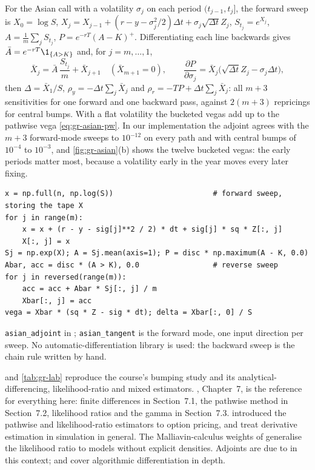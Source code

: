For the Asian call with a volatility $\sigma_j$ on each period $(t_{j-1},t_j]$, the forward sweep
is $X_0=\log S$, $X_j=X_{j-1}+(r-y-\sigma_j^2/2)\Delta t+\sigma_j\sqrt{\Delta t}Z_j$,
$S_{t_j}=e^{X_j}$, $A=\frac1m\sum_jS_{t_j}$, $P=e^{-rT}(A-K)^+$. Differentiating each line
backwards gives $\bar A=e^{-rT}\1_{\{A>K\}}$ and, for $j=m,\dots,1$,
\[
  \bar X_j=\bar A\,\frac{S_{t_j}}m+\bar X_{j+1}\quad(\bar X_{m+1}=0),\qquad
  \frac{\partial P}{\partial\sigma_j}=\bar X_j\big(\sqrt{\Delta t}Z_j-\sigma_j\Delta t\big),
\]
then $\Delta=\bar X_1/S$, $\rho_y=-\Delta t\sum_j\bar X_j$ and
$\rho_r=-TP+\Delta t\sum_j\bar X_j$: all $m+3$ sensitivities for one forward and one backward
pass, against $2(m+3)$ repricings for central bumps. With a flat volatility the bucketed vegas
add up to the pathwise vega \eqref{eq:gr-asian-pw}. In our implementation the adjoint agrees
with the $m+3$ forward-mode sweeps to $10^{-12}$ on every path and with central bumps of
$10^{-4}$ to $10^{-3}$, and \cref{fig:gr-asian}(b) shows the twelve bucketed vegas: the early periods
matter most, because a volatility early in the year moves every later fixing.

\begin{incode}
\begin{lstlisting}
x = np.full(n, np.log(S))                       # forward sweep, storing the tape X
for j in range(m):
    x = x + (r - y - sig[j]**2 / 2) * dt + sig[j] * sq * Z[:, j]
    X[:, j] = x
Sj = np.exp(X); A = Sj.mean(axis=1); P = disc * np.maximum(A - K, 0.0)
Abar, acc = disc * (A > K), 0.0                 # reverse sweep
for j in reversed(range(m)):
    acc = acc + Abar * Sj[:, j] / m
    Xbar[:, j] = acc
vega = Xbar * (sq * Z - sig * dt); delta = Xbar[:, 0] / S
\end{lstlisting}
\texttt{asian\_adjoint} in ; \texttt{asian\_tangent} is the
forward mode, one input direction per sweep. No automatic-differentiation library is used:
the backward sweep is the chain rule written by hand.
\end{incode}


\furtherreading
{} and \cref{tab:gr-lab} reproduce the course's bumping study and its
analytical-differencing, likelihood-ratio and mixed estimators. \textcite{glasserman-mc},
Chapter~7, is the reference for everything here: finite differences in Section~7.1, the
pathwise method in Section~7.2, likelihood ratios and the gamma in Section~7.3.
\textcite{broadie-glasserman-greeks} introduced the pathwise and likelihood-ratio estimators
to option pricing, and \citet[Chapter~VII]{asmussen-glynn} treat derivative estimation in
simulation in general. The Malliavin-calculus weights of \textcite{fournie-malliavin} generalise
the likelihood ratio to models without explicit densities. Adjoints are due to
\textcite{giles-glasserman-adjoints} in this context; \textcite{capriotti-aad} and
\textcite{griewank-walther} cover algorithmic differentiation in depth.
